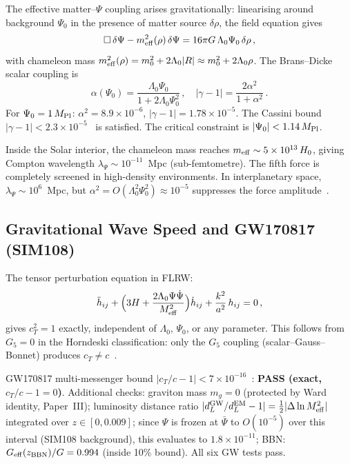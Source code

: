\documentclass[12pt,a4paper]{article}
\newcommand{\Psibar}{\bar\Psi}
\newcommand{\Geff}{G_{\rm eff}}
\newcommand{\Lz}{\Lambda_0}
\newcommand{\Mpl}{M_{\rm Pl}}
\begin{document}
The effective matter--$\Psi$ coupling arises gravitationally: linearising
around background $\Psi_0$ in the presence of matter source $\delta\rho$,
the field equation gives
\begin{equation}
  \Box\,\delta\Psi - m_{\rm eff}^2(\rho)\,\delta\Psi
  = 16\pi G\,\Lz\Psi_0\,\delta\rho\,,
\end{equation}
with chameleon mass $m_{\rm eff}^2(\rho) = m_0^2 + 2\Lz|R| \approx
m_0^2 + 2\Lz\rho$. The Brans--Dicke scalar coupling is
\begin{equation}
  \alpha(\Psi_0) = \frac{\Lz\Psi_0}{1 + 2\Lz\Psi_0^2}\,,
  \quad
  |\gamma - 1| = \frac{2\alpha^2}{1 + \alpha^2}\,.
\end{equation}
For $\Psi_0 = 1\,\Mpl$: $\alpha^2 = 8.9\times10^{-6}$,
$|\gamma - 1| = 1.78\times10^{-5}$.
The Cassini bound $|\gamma - 1| < 2.3\times10^{-5}$~\cite{Bertotti2003}
is satisfied. The critical constraint is $|\Psi_0| < 1.14\,\Mpl$.

Inside the Solar interior, the chameleon mass reaches $m_{\rm eff} \sim
5\times10^{13}\,H_0$, giving Compton wavelength $\lambda_\Psi \sim
10^{-11}$~Mpc (sub-femtometre). The fifth force is completely screened
in high-density environments. In interplanetary space, $\lambda_\Psi \sim
10^6$~Mpc, but $\alpha^2 = O(\Lz^2\Psi_0^2) \approx 10^{-5}$ suppresses
the force amplitude~\cite{Will2014}.

\subsection{Gravitational Wave Speed and GW170817 (SIM108)}
\label{sec:gw}

The tensor perturbation equation in FLRW:
\begin{equation}
  \ddot h_{ij} + \Bigl(3H + \frac{2\Lz\Psi\dot\Psi}{M_{\rm eff}^2}\Bigr)\dot h_{ij}
  + \frac{k^2}{a^2}\,h_{ij} = 0\,,
\end{equation}
gives $c_T^2 = 1$ exactly, independent of $\Lz$, $\Psi_0$, or any parameter.
This follows from $G_5 = 0$ in the Horndeski classification: only the $G_5$
coupling (scalar--Gauss--Bonnet) produces $c_T \neq c$~\cite{Creminelli2017}.

GW170817 multi-messenger bound $|c_T/c - 1| < 7\times10^{-16}$~\cite{Abbott2017}:
\textbf{PASS (exact, $c_T/c - 1 = 0$)}. Additional checks:
graviton mass $m_g = 0$ (protected by Ward identity, Paper~III);
luminosity distance ratio $|d_L^{\rm GW}/d_L^{\rm EM} - 1|
= \tfrac{1}{2}|\Delta\ln M_{\rm eff}^2|$ integrated over $z\in[0,0.009]$;
since $\Psi$ is frozen at $\Psibar$ to $O(10^{-5})$ over this interval
(SIM108 background), this evaluates to $1.8\times10^{-11}$;
BBN: $\Geff(z_{\rm BBN})/G = 0.994$ (inside 10\% bound). All six GW tests pass.
\end{document}
